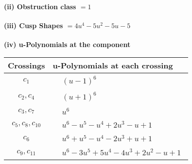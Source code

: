 \documentclass[1p]{elsarticle_modified}
\theoremstyle{definition}
\begin{document}
\flushleft \textbf{(ii) Obstruction class $= 1$}\\~\\
\flushleft \textbf{(iii) Cusp Shapes $= 4 u^4-5 u^2-5 u-5$}\\~\\
\newpage\renewcommand{\arraystretch}{1}
\flushleft \textbf{(iv) u-Polynomials at the component}\newline \\
\begin{tabular}{m{50pt}|m{274pt}}
Crossings & \hspace{64pt}u-Polynomials at each crossing \\
\hline $$\begin{aligned}c_{1}\end{aligned}$$&$\begin{aligned}
&(u-1)^6
\end{aligned}$\\
\hline $$\begin{aligned}c_{2},c_{4}\end{aligned}$$&$\begin{aligned}
&(u+1)^6
\end{aligned}$\\
\hline $$\begin{aligned}c_{3},c_{7}\end{aligned}$$&$\begin{aligned}
&u^6
\end{aligned}$\\
\hline $$\begin{aligned}c_{5},c_{8},c_{10}\end{aligned}$$&$\begin{aligned}
&u^6- u^5- u^4+2 u^3- u+1
\end{aligned}$\\
\hline $$\begin{aligned}c_{6}\end{aligned}$$&$\begin{aligned}
&u^6+u^5- u^4-2 u^3+u+1
\end{aligned}$\\
\hline $$\begin{aligned}c_{9},c_{11}\end{aligned}$$&$\begin{aligned}
&u^6-3 u^5+5 u^4-4 u^3+2 u^2- u+1
\end{aligned}$\\
\hline
\end{tabular}\\~\\
\end{document}
